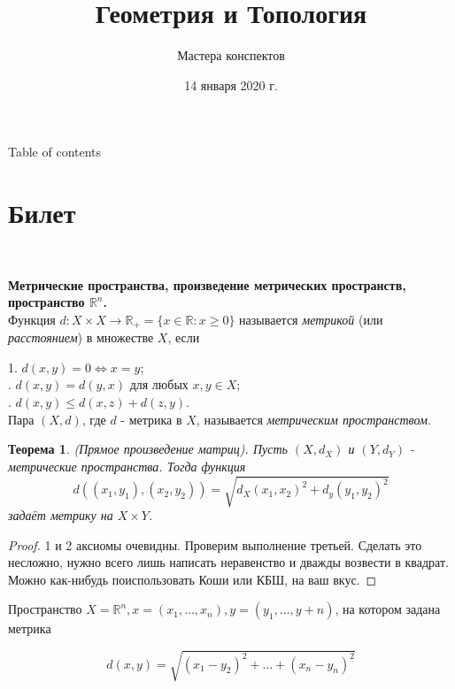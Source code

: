 \documentclass[a4paper,100pt]{article}
\title{Геометрия и Топология}
\author{Мастера конспектов}
\date{14 января 2020 г.}
\theoremstyle{indented}
\newtheorem{theorem}{Теорема}
\begin{document}
\maketitle 

\newpage

\hypertarget{t1}{Table of contents}
\tableofcontents

\newpage

\section{Билет} \

\medskip

\textbf{Метрические пространства, произведение метрических пространств, пространство $\mathbb{R}^n$.} \\

Функция $d: X \times X \rightarrow \mathbb{R}_+ = \{x \in \mathbb{R} : x\geq 0\}$ называется \hypertarget{n1}{\textit{метрикой}} (или \textit{расстоянием}) 
в множестве $X$, если \

\medskip

1. $d(x, y)=0 \Leftrightarrow x=y$; \\
. $d(x, y)= d(y, x)$ для любых $x, y \in X$; \\
. $d(x, y)\leq d(x, z)+d(z, y)$. \\

Пара $(X, d)$, где $d$ - метрика в $X$, называется \hypertarget{n2}{\textit{метрическим пространством}}. \\

\begin{theorem}
(Прямое произведение матриц). Пусть $(X, d_X)$ и $(Y, d_Y)$ - метрические пространства. Тогда функция
\[
    d((x_1, y_1), (x_2, y_2))=\sqrt{d_X(x_1, x_2)^2+d_y(y_1, y_2)^2}
\]
задаёт метрику на $X\times Y$.
\end{theorem}

\begin{proof}
1 и 2 аксиомы очевидны. Проверим выполнение третьей. Сделать это несложно, нужно всего лишь написать неравенство и дважды возвести в квадрат. Можно как-нибудь поиспользовать Коши или КБШ, на ваш вкус.
\end{proof}

\medskip

Пространство $X=\mathbb{R}^n, x=(x_1, \dots, x_n), y=(y_1, \dots, y+n)$, на котором задана метрика

\[
    d(x, y)=\sqrt{(x_1-y_2)^2+\dots+(x_n-y_n)^2}
\]
\end{document}
